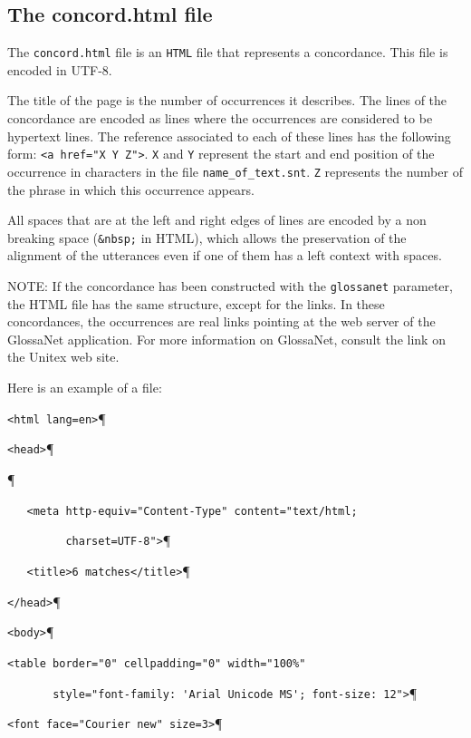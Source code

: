 \subsection{The concord.html file}
The \verb+concord.html+ file is an \verb+HTML+ file that represents a
concordance. This file is encoded in UTF-8.

\bigskip
\noindent The title of the page is the number of occurrences it describes. The
lines of the concordance are encoded as lines where the occurrences are
considered to be hypertext lines. The reference associated to each of these lines
has the following form: \verb+<a href="X Y Z">+. \verb+X+ and \verb+Y+ represent
the start and end position of the occurrence in characters in the file
\verb+name_of_text.snt+. \verb+Z+ represents the number of the phrase in which
this occurrence appears.

\bigskip
\noindent All spaces that are at the left and right edges of lines are encoded by
a non breaking space (\verb+&nbsp;+ in HTML), which allows the preservation of
the alignment of the utterances even if one of them has a left context with
spaces.

\bigskip
\noindent NOTE: If the concordance has been constructed with the \verb+glossanet+
parameter, the HTML file has the same structure, except for the links. In
these concordances, the occurrences are real links pointing at the web server of
the GlossaNet application. For more information on GlossaNet, consult the link on
the Unitex web site. 

\bigskip
\noindent Here is an example of a file:

\bigskip

\verb$<html lang=en>$\P

\verb$<head>$\P

\verb$$\P

\verb$   <meta http-equiv="Content-Type" content="text/html;$

\verb$         charset=UTF-8">$\P

\verb$   <title>6 matches</title>$\P

\verb$</head>$\P

\verb$<body>$\P

\verb$<table border="0" cellpadding="0" width="100%" $

\verb$       style="font-family: 'Arial Unicode MS'; font-size: 12">$\P

\verb$<font face="Courier new" size=3>$\P

